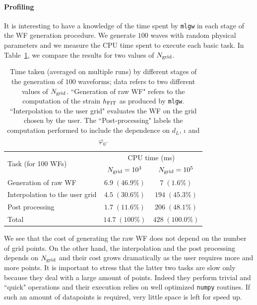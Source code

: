 \documentclass[twocolumn,showpacs,preprintnumbers,nofootinbib,prd,
superscriptaddress,10pt]{revtex4-1}
\begin{document}
\paragraph{Profiling}
It is interesting to have a knowledge of the time spent by \texttt{mlgw} 
in each stage of the WF generation procedure. We generate $100$ waves with random 
physical parameters and we measure the CPU time spent to execute each basic task.
In Table~\ref{tab:profiling}, we compare the results for two values of $N_{\rm grid}$.
\begin{table}
	\caption{
Time taken (averaged on multiple runs) by different stages of the generation of $100$ waveforms;
data refers to two different values of $N_{\rm grid}$.
``Generation of raw WF" refers to the computation of the strain $h_{\rm FIT}$ as produced by \texttt{mlgw}. 
``Interpolation to the user grid" evaluates the WF on the grid chosen by the user. 
The ``Post-processing" labels the computation performed to include the dependence on $d_L$, $\iota$ and $\varphi_0$.
}
	\label{tab:profiling}
	\def\arraystretch{1.5}
	\begin{ruledtabular}
	\begin{tabular}{ l c c }
		\multirow{2}{*}{Task (for 100 WFs)}& \multicolumn{2}{c}{CPU time (ms)}\\
			&$N_{\rm grid} = 10^3$	& $N_{\rm grid} = 10^5$\\
	\hline \hline
		 Generation of raw WF 			& $6.9 \; (46.9\%)$	& $7 \; (1.6\%)$ \\ 
	\hline
		 Interpolation to the user grid & $4.5 \; (30.6\%)$	& $194 \; (45.3\%)$ \\ 
	\hline
		 Post processing 				& $1.7 \; (11.6\%)$	& $206 \; (48.1\%)$ \\
	\hline
		 Total							& $14.7 \; (100\%)$ &  $428 \; (100.0\%)$ \\
	\end{tabular}
	\end{ruledtabular}
\end{table}
We see that the cost of generating the raw WF does not depend on the number of grid points. 
On the other hand, the interpolation and the post processing depends on $N_{\rm grid}$ and their 
cost grows dramatically as the user requires more and more points. It is important to stress that 
the latter two tasks are slow only because they deal with a large amount of points. Indeed they perform 
trivial and ``quick" operations and their execution relies on well optimized \texttt{numpy} routines.
If such an amount of datapoints is required, very little space is left for speed up.
\end{document}
